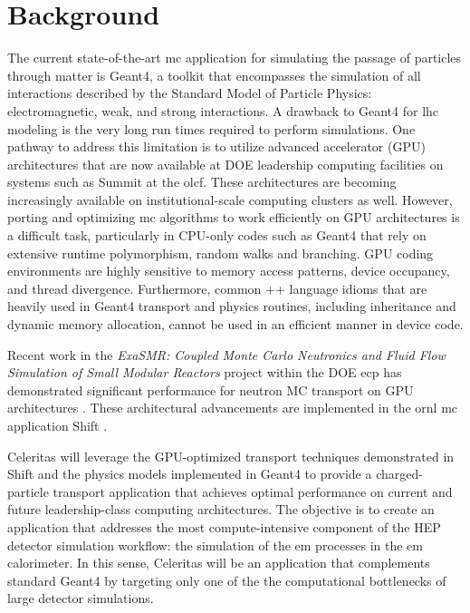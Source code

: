 \documentclass[10pt]{article}
\begin{document}
\section*{Background}

The current state-of-the-art \ac{mc} application for simulating
the passage of particles through matter is Geant4, a toolkit
that encompasses the simulation of all interactions described by the Standard
Model of Particle Physics: electromagnetic, weak, and strong
interactions. A drawback to Geant4 for \ac{lhc} modeling is the very long run
times required to perform simulations. One pathway to address this
limitation is to utilize advanced accelerator (GPU) architectures that
are now available at DOE leadership computing facilities on systems such
as Summit at the \ac{olcf}. These architectures are becoming increasingly
available on institutional-scale computing clusters as well. However,
porting and optimizing \ac{mc} algorithms to work efficiently on GPU
architectures is a difficult task, particularly in CPU-only codes such
as Geant4 that rely on extensive runtime polymorphism, random walks and branching.
GPU coding environments are highly sensitive to memory access patterns, device
occupancy, and thread divergence. Furthermore, common \C++ language
idioms that are heavily used in Geant4 transport and physics routines,
including inheritance and dynamic memory allocation, cannot be used in an
efficient manner in device code.

Recent work in the \emph{ExaSMR: Coupled Monte Carlo Neutronics and
Fluid Flow Simulation of Small Modular Reactors} project within the DOE
\ac{ecp} \cite{ecp2019} has
demonstrated significant performance for neutron MC transport on GPU
architectures \cite{hamilton_continuous-energy_2019}. These architectural
advancements are implemented in the \ac{ornl} \ac{mc} application Shift 
\cite{pandya_implementation_2016}. 

Celeritas will leverage the GPU-optimized transport techniques demonstrated
in Shift and the physics models implemented in Geant4
to provide a charged-particle
transport application that achieves optimal performance on current and
future leadership-class computing architectures. The objective is to
create an application that addresses the most compute-intensive
component of the HEP detector simulation workflow: the simulation of the \ac{em} processes in the \ac{em} calorimeter.
In this sense, Celeritas will be an application that complements standard
Geant4 by targeting only one of the the computational bottlenecks of large detector simulations.
\end{document}
